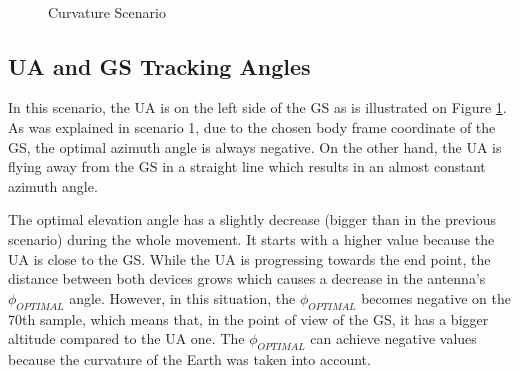 \begin{figure}[H]
	\\
	\hfill
	\caption{Curvature Scenario}
	\label{fig:s2_map}
\end{figure}


\subsection*{UA and GS Tracking Angles}
In this scenario, the UA is on the left side of the GS as is illustrated on Figure \ref{fig:s2_map}. As was explained in scenario 1, due to the chosen body frame coordinate of the GS, the optimal azimuth angle is always negative. On the other hand, the UA is flying away from the GS in a straight line which results in an almost constant azimuth angle. 

The optimal elevation angle has a slightly decrease (bigger than in the previous scenario) during the whole movement. It starts with a higher value because the UA is close to the GS. While the UA is progressing towards the end point, the distance between both devices grows which causes a decrease in the antenna's $\phi_{OPTIMAL}$ angle. However, in this situation, the $\phi_{OPTIMAL}$ becomes negative on the 70th sample, which means that, in the point of view of the GS, it has a bigger altitude compared to the UA one. The $\phi_{OPTIMAL}$ can achieve negative values because the curvature of the Earth was taken into account.

